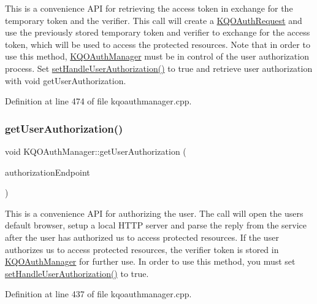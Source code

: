 This is a convenience A\+PI for retrieving the access token in exchange for the temporary token and the verifier. This call will create a \hyperlink{class_k_q_o_auth_request}{K\+Q\+O\+Auth\+Request} and use the previously stored temporary token and verifier to exchange for the access token, which will be used to access the protected resources. Note that in order to use this method, \hyperlink{class_k_q_o_auth_manager}{K\+Q\+O\+Auth\+Manager} must be in control of the user authorization process. Set \hyperlink{class_k_q_o_auth_manager_a55409df469317596b81ab50823eb6a97}{set\+Handle\+User\+Authorization()} to true and retrieve user authorization with void get\+User\+Authorization. 

Definition at line 474 of file kqoauthmanager.\+cpp.

\mbox{\label{class_k_q_o_auth_manager_ab33a5aead44d35476d13152f4a35700b}} 
\subsubsection{\texorpdfstring{get\+User\+Authorization()}{getUserAuthorization()}}
{\footnotesize\ttfamily void K\+Q\+O\+Auth\+Manager\+::get\+User\+Authorization (\begin{DoxyParamCaption}\item[{Q\+Url}]{authorization\+Endpoint }\end{DoxyParamCaption})}

This is a convenience A\+PI for authorizing the user. The call will open the user\textquotesingle{}s default browser, setup a local H\+T\+TP server and parse the reply from the service after the user has authorized us to access protected resources. If the user authorizes us to access protected resources, the verifier token is stored in \hyperlink{class_k_q_o_auth_manager}{K\+Q\+O\+Auth\+Manager} for further use. In order to use this method, you must set \hyperlink{class_k_q_o_auth_manager_a55409df469317596b81ab50823eb6a97}{set\+Handle\+User\+Authorization()} to true. 

Definition at line 437 of file kqoauthmanager.\+cpp.

\mbox{\label{class_k_q_o_auth_manager_a559976e71f9e27e0a34ce8aeacd8387a}} 

